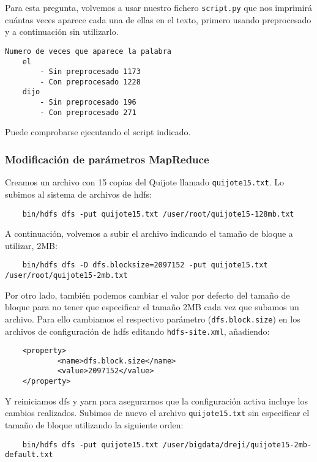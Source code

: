 \documentclass[11pt]{article}
\def\inline{\lstinline[basicstyle=\ttfamily,keywordstyle={}]}
\begin{document}
Para esta pregunta, volvemos a usar nuestro fichero \inline{script.py} que nos imprimirá cuántas veces aparece cada una de ellas en el texto, primero usando preprocesado y a continuación sin utilizarlo.

\begin{verbatim}
Numero de veces que aparece la palabra
    el
        - Sin preprocesado 1173
        - Con preprocesado 1228
    dijo
        - Sin preprocesado 196
        - Con preprocesado 271
\end{verbatim}

Puede comprobarse ejecutando el script indicado.

\subsubsection{ Modificación de parámetros MapReduce }

Creamos un archivo con 15 copias del Quijote llamado \inline{quijote15.txt}. Lo subimos al sistema de archivos de hdfs:

\begin{verbatim}
	bin/hdfs dfs -put quijote15.txt /user/root/quijote15-128mb.txt
\end{verbatim}

A continuación, volvemos a subir el archivo indicando el tamaño de bloque a utilizar, 2MB:

\begin{verbatim}
	bin/hdfs dfs -D dfs.blocksize=2097152 -put quijote15.txt /user/root/quijote15-2mb.txt
\end{verbatim}

Por otro lado, también podemos cambiar el valor por defecto del tamaño de bloque para no tener que especificar el tamaño 2MB cada vez que subamos un archivo. Para ello cambiamos el respectivo parámetro (\inline{dfs.block.size}) en los archivos de configuración de hdfs editando \inline{hdfs-site.xml}, añadiendo:

\begin{verbatim}
	<property>
	        <name>dfs.block.size</name>
	        <value>2097152</value>
	</property>
\end{verbatim}

Y reiniciamos dfs y yarn para asegurarnos que la configuración activa incluye los cambios realizados. Subimos de nuevo el archivo \inline{quijote15.txt} sin especificar el tamaño de bloque utilizando la siguiente orden:

\begin{verbatim}
	bin/hdfs dfs -put quijote15.txt /user/bigdata/dreji/quijote15-2mb-default.txt
\end{verbatim}
\end{document}
